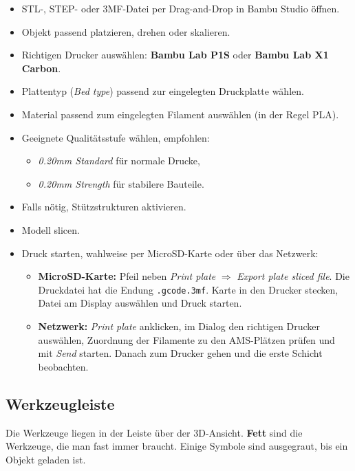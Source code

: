 \documentclass{\basedir/fablab-document}
\newcommand{\ra}{$\Rightarrow$}
\begin{document}
	\begin{itemize}
		\item STL-, STEP- oder 3MF-Datei per Drag-and-Drop in Bambu Studio öffnen.
		\item Objekt passend platzieren, drehen oder skalieren.
		\item Richtigen Drucker auswählen: \textbf{Bambu Lab P1S} oder \textbf{Bambu Lab X1 Carbon}.
		\item Plattentyp (\textit{Bed type}) passend zur eingelegten Druckplatte wählen.
		\item Material passend zum eingelegten Filament auswählen (in der Regel PLA).
		\item Geeignete Qualitätsstufe wählen, empfohlen:
		\begin{itemize}
			\item \textit{0.20mm Standard} für normale Drucke,
			\item \textit{0.20mm Strength} für stabilere Bauteile.
		\end{itemize}
		\item Falls nötig, Stützstrukturen aktivieren.
		\item Modell slicen.
		\item Druck starten, wahlweise per MicroSD-Karte oder über das Netzwerk:
		\begin{itemize}
			\item \textbf{MicroSD-Karte:} Pfeil neben \textit{Print plate} \ra{} \textit{Export plate sliced file}. Die Druckdatei hat die Endung \texttt{.gcode.3mf}. Karte in den Drucker stecken, Datei am Display auswählen und Druck starten.
			\item \textbf{Netzwerk:} \textit{Print plate} anklicken, im Dialog den richtigen Drucker auswählen, Zuordnung der Filamente zu den AMS-Plätzen prüfen und mit \textit{Send} starten. Danach zum Drucker gehen und die erste Schicht beobachten.
		\end{itemize}
	\end{itemize}
	
	\subsection{Werkzeugleiste}
	
	Die Werkzeuge liegen in der Leiste über der 3D-Ansicht. \textbf{Fett} sind die Werkzeuge, die man fast immer braucht. Einige Symbole sind ausgegraut, bis ein Objekt geladen ist.
	
\end{document}
